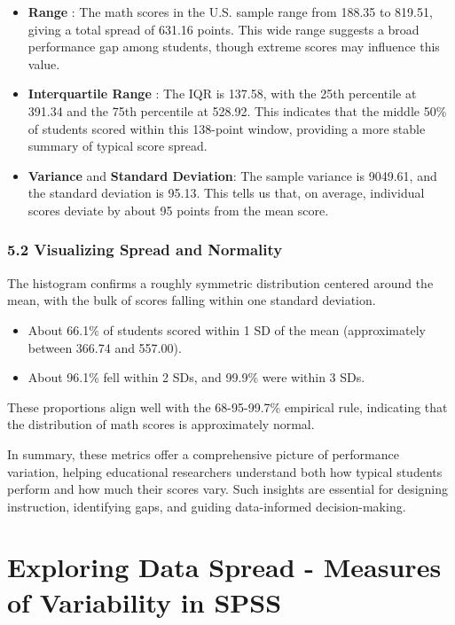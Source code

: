 \documentclass[
  letterpaper,
  DIV=11,
  numbers=noendperiod]{scrreprt}
\begin{document}
\begin{itemize}
\item
  \textbf{Range} : The math scores in the U.S. sample range from 188.35
  to 819.51, giving a total spread of 631.16 points. This wide range
  suggests a broad performance gap among students, though extreme scores
  may influence this value.
\item
  \textbf{Interquartile Range} : The IQR is 137.58, with the 25th
  percentile at 391.34 and the 75th percentile at 528.92. This indicates
  that the middle 50\% of students scored within this 138-point window,
  providing a more stable summary of typical score spread.
\item
  \textbf{Variance} and \textbf{Standard Deviation}: The sample variance
  is 9049.61, and the standard deviation is 95.13. This tells us that,
  on average, individual scores deviate by about 95 points from the mean
  score.
\end{itemize}

\subsection*{5.2 Visualizing Spread and
Normality}\label{visualizing-spread-and-normality}

The histogram confirms a roughly symmetric distribution centered around
the mean, with the bulk of scores falling within one standard deviation.

\begin{itemize}
\item
  About 66.1\% of students scored within 1 SD of the mean (approximately
  between 366.74 and 557.00).
\item
  About 96.1\% fell within 2 SDs, and 99.9\% were within 3 SDs.
\end{itemize}

These proportions align well with the 68-95-99.7\% empirical rule,
indicating that the distribution of math scores is approximately normal.

In summary, these metrics offer a comprehensive picture of performance
variation, helping educational researchers understand both how typical
students perform and how much their scores vary. Such insights are
essential for designing instruction, identifying gaps, and guiding
data-informed decision-making.


\chapter*{Exploring Data Spread - Measures of Variability in
SPSS}\label{exploring-data-spread---measures-of-variability-in-spss}
\end{document}
